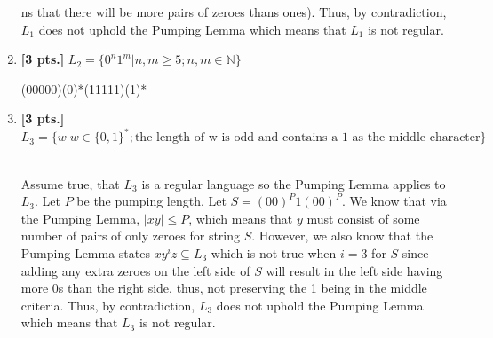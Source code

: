 \documentclass[11pt]{article}
\theoremstyle{definition}
\theoremstyle{theorem}
\newcommand{\solution}{\medskip\noindent{\color{blue}\textbf{Solution:}}}
\begin{document}
\begin{enumerate}[label=(\alph*)]
ns that there will be more pairs of zeroes thans ones). Thus, by contradiction, $L_1$ does not uphold the Pumping Lemma which means that $L_1$ is not regular.

\item \textbf{[3 pts.]}  $L_2 = \{0^n1^m | n,m \geq 5; n,m \in \mathbb{N}\}$

\solution 

(00000)(0)*(11111)(1)*

\item \textbf{[3 pts.]}  $L_3 = \{w |  w\in \{0,1\}^*; \text{the length of w is odd and contains a 1 as the middle character}\}$

\solution 
\\ Assume true, that $L_3$ is a regular language so the Pumping Lemma applies to $L_3$. Let $P$ be the pumping length. Let $S = (00)^P1(00)^P$. We know that via the Pumping Lemma, $\left\lvert xy \right\rvert \leq P$, which means that $y$ must consist of some number of pairs of only zeroes for string $S$. However, we also know that the Pumping Lemma states $xy^iz \subseteq L_3$ which is not true when $i = 3$ for $S$ since adding any extra zeroes on the left side of $S$ will result in the left side having more 0s than the right side, thus, not preserving the 1 being in the middle criteria. Thus, by contradiction, $L_3$ does not uphold the Pumping Lemma which means that $L_3$ is not regular.

\end{enumerate}
\end{document}
